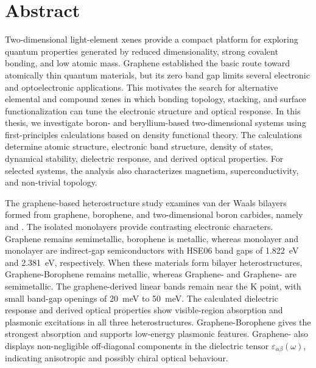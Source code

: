 \chapter*{Abstract}

Two-dimensional light-element xenes provide a compact platform for exploring quantum properties generated by reduced dimensionality, strong covalent bonding, and low atomic mass.
Graphene established the basic route toward atomically thin quantum materials, but its zero band gap limits several electronic and optoelectronic applications.
This motivates the search for alternative elemental and compound xenes in which bonding topology, stacking, and surface functionalization can tune the electronic structure and optical response.
In this thesis, we investigate boron- and beryllium-based two-dimensional systems using first-principles calculations based on density functional theory.
The calculations determine atomic structure, electronic band structure, density of states, dynamical stability, dielectric response, and derived optical properties.
For selected systems, the analysis also characterizes magnetism, superconductivity, and non-trivial topology.

The graphene-based heterostructure study examines van der Waals bilayers formed from graphene, borophene, and two-dimensional boron carbides, namely  and .
The isolated monolayers provide contrasting electronic characters.
Graphene remains semimetallic, borophene is metallic, whereas monolayer  and monolayer  are indirect-gap semiconductors with HSE06 band gaps of \qty{1.822}{\electronvolt} and \qty{2.381}{\electronvolt}, respectively.
When these materials form bilayer heterostructures, Graphene-Borophene remains metallic, whereas Graphene- and Graphene- are semimetallic.
The graphene-derived linear bands remain near the $\mathrm{K}$ point, with small band-gap openings of \qty{20}{\milli\electronvolt} to \qty{50}{\milli\electronvolt}.
The calculated dielectric response and derived optical properties show visible-region absorption and plasmonic excitations in all three heterostructures.
Graphene-Borophene gives the strongest absorption and supports low-energy plasmonic features.
Graphene- also displays non-negligible off-diagonal components in the dielectric tensor $\varepsilon_{\alpha\beta}(\omega)$, indicating anisotropic and possibly chiral optical behaviour.

